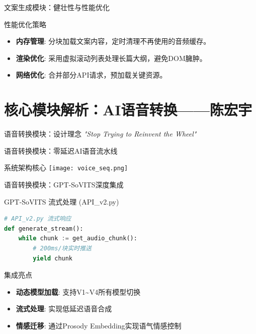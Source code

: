 \documentclass{beamer}
\begin{document}
\begin{frame}{文案生成模块：健壮性与性能优化}
\begin{block}{性能优化策略}
\begin{itemize}
\item \textbf{内存管理}: 分块加载文案内容，定时清理不再使用的音频缓存。
\item \textbf{渲染优化}: 采用虚拟滚动列表处理长篇大纲，避免DOM臃肿。
\item \textbf{网络优化}: 合并部分API请求，预加载关键资源。
\end{itemize}
\end{block}
\end{frame}

\section{核心模块解析：AI语音转换——陈宏宇}

\begin{frame}{语音转换模块：设计理念}
    \centering
    \textit{"Stop Trying to Reinvent the Wheel"}
\end{frame}
\begin{frame}{语音转换模块：零延迟AI语音流水线}
    \begin{block}{系统架构核心}
        \centering
        \texttt{[image: voice\_seq.png]}
    \end{block}
\end{frame}
\begin{frame}[fragile]{语音转换模块：GPT-SoVITS深度集成}
    \begin{block}{GPT-SoVITS 流式处理 (API\_v2.py)}
\begin{lstlisting}[language=Python]
# API_v2.py 流式响应
def generate_stream():
    while chunk := get_audio_chunk():
        # 200ms/块实时推送
        yield chunk  
\end{lstlisting}
    \end{block}
    \begin{exampleblock}{集成亮点}
        \begin{itemize}
            \item \textbf{动态模型加载}: 支持V1\textasciitilde V4所有模型切换
            \item \textbf{流式处理}: 实现低延迟语音合成
            \item \textbf{情感迁移}: 通过Prosody Embedding实现语气情感控制
        \end{itemize}
    \end{exampleblock}
\end{frame}
\end{document}
